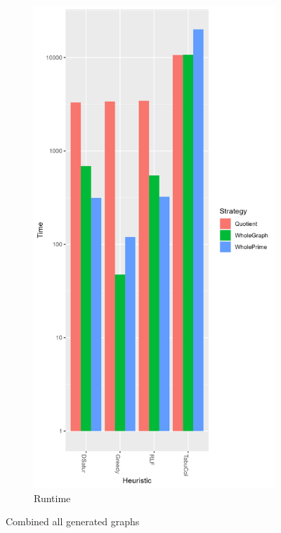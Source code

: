 \documentclass[a4paper]{article}
\begin{document}
\begin{figure}
\begin{subfigure}{.5\paperwidth}
    \end{subfigure}%
    \begin{subfigure}{.5\paperwidth}
        \includegraphics[width=\columnwidth]{Tables/GeneratedTime.png}
      \caption{Runtime}
      \label{fig:generatedt}
    \end{subfigure}
\caption{Combined all generated graphs}
\label{fig:generated}
\end{figure}
\end{document}
